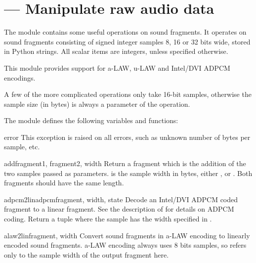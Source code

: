 \section{ ---
         Manipulate raw audio data}



The  module contains some useful operations on sound
fragments.  It operates on sound fragments consisting of signed
integer samples 8, 16 or 32 bits wide, stored in Python strings.
All scalar items are integers, unless specified otherwise.

This module provides support for a-LAW, u-LAW and Intel/DVI ADPCM encodings.

A few of the more complicated operations only take 16-bit samples,
otherwise the sample size (in bytes) is always a parameter of the
operation.

The module defines the following variables and functions:

\begin{excdesc}{error}
This exception is raised on all errors, such as unknown number of bytes
per sample, etc.
\end{excdesc}

\begin{funcdesc}{add}{fragment1, fragment2, width}
Return a fragment which is the addition of the two samples passed as
parameters.   is the sample width in bytes, either
,  or .  Both fragments should have the same
length.
\end{funcdesc}

\begin{funcdesc}{adpcm2lin}{adpcmfragment, width, state}
Decode an Intel/DVI ADPCM coded fragment to a linear fragment.  See
the description of  for details on ADPCM coding.
Return a tuple  where the sample
has the width specified in .
\end{funcdesc}

\begin{funcdesc}{alaw2lin}{fragment, width}
Convert sound fragments in a-LAW encoding to linearly encoded sound
fragments.  a-LAW encoding always uses 8 bits samples, so 
refers only to the sample width of the output fragment here.
\end{funcdesc}

